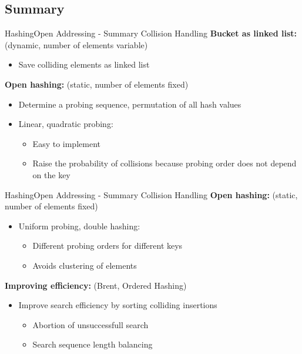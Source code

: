 
\subsection{Summary}

\begin{frame}{Hashing}{Open Addressing - Summary Collision Handling}
  \textbf{Bucket as linked list:}
  {\color{Mittel-Blau}(dynamic, number of elements variable)}
  \begin{itemize}
    \item
      Save colliding elements as linked list
  \end{itemize}
  \vspace{1.0em}
  \textbf{Open hashing:}
  {\color{Mittel-Blau}(static, number of elements fixed)}
  \begin{itemize}
    \item
      Determine a probing sequence, permutation of all hash values
    \item
      Linear, quadratic probing:
      \begin{itemize}
        \item
          Easy to implement
        \item
          Raise the probability of collisions because probing order does
          not depend on the key
      \end{itemize}
  \end{itemize}
\end{frame}


\begin{frame}{Hashing}{Open Addressing - Summary Collision Handling}
  \textbf{Open hashing:}
         {\color{Mittel-Blau}(static, number of elements fixed)}
  \begin{itemize}
    \item
      Uniform probing, double hashing:
      \begin{itemize}
        \item
          Different probing orders for different keys
        \item
          Avoids clustering of elements
      \end{itemize}
  \end{itemize}
  \vspace{1.0em}
  \textbf{Improving efficiency:}
  {\color{Mittel-Blau}(Brent, Ordered Hashing)}
  \begin{itemize}
    \item
      Improve search efficiency by sorting colliding insertions
      \begin{itemize}
        \item
          Abortion of unsuccessfull search
        \item
          Search sequence length balancing
      \end{itemize}
  \end{itemize}
\end{frame}

